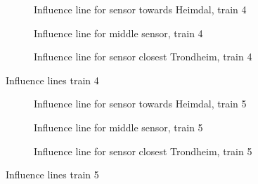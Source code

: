 \begin{figure}[htpb]
  \begin{subfigure}[t]{0.9\textwidth}
    \centering
    
    \caption{Influence line for sensor towards Heimdal, train 4}
    \label{infl_Heimdal_train4}
  \end{subfigure}
  \begin{subfigure}[t]{0.9\textwidth}
    \centering
    
    \caption{Influence line for middle sensor, train 4}
    \label{infl_middle_train4}
  \end{subfigure}
  \begin{subfigure}[t]{0.9\textwidth}
    \centering
    
    \caption{Influence line for sensor closest Trondheim, train 4}
    \label{infl_Trondheim_train4}
  \end{subfigure}
  \caption{Influence lines train 4}
  \label{influence_lines_train3}
\end{figure}

\begin{figure}[htpb]
  \begin{subfigure}[t]{0.9\textwidth}
    \centering
    
    \caption{Influence line for sensor towards Heimdal, train 5}
    \label{infl_Heimdal_train5}
  \end{subfigure}
  \begin{subfigure}[t]{0.9\textwidth}
    \centering
    
    \caption{Influence line for middle sensor, train 5}
    \label{infl_middle_train5}
  \end{subfigure}
  \begin{subfigure}[t]{0.9\textwidth}
    \centering
    
    \caption{Influence line for sensor closest Trondheim, train 5}
    \label{infl_Trondheim_train5}
  \end{subfigure}
  \caption{Influence lines train 5}
  \label{influence_lines_train5}
\end{figure}

